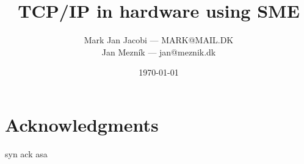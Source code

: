 \documentclass[oneside,a4paper,oldfontcommands]{memoir}
\author{Mark Jan Jacobi --- {\ttfamily MARK@MAIL.DK} \\
        Jan Mezník --- {\ttfamily jan@meznik.dk}}
\title{TCP/IP in hardware using SME}
\date{\today}
\begin{document}

\frontmatter

\begin{titlingpage}
\maketitle
\end{titlingpage}

\newpage
\begin{abstract}

\end{abstract}
\newpage


\chapter{Acknowledgments}
syn ack asa
\newpage
\tableofcontents

\printglossary[type=\acronymtype,title=Abbrevations]


\mainmatter



\printbibliography{}

\appendix

\end{document}
